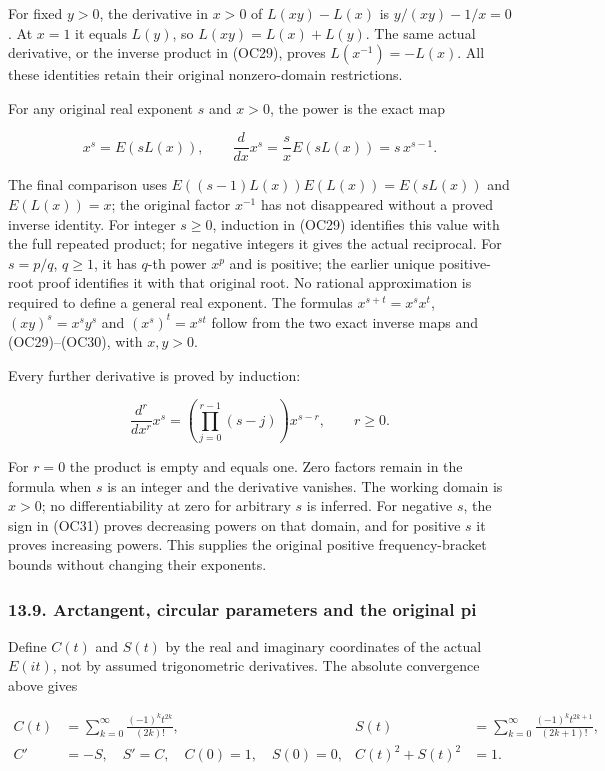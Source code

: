 \documentclass[
  11pt,
]{article}
\begin{document}
For fixed \(y>0\), the derivative in \(x>0\) of \(L(xy)-L(x)\) is
\(y/(xy)-1/x=0\). At \(x=1\) it equals \(L(y)\), so \(L(xy)=L(x)+L(y)\).
The same actual derivative, or the inverse product in (OC29), proves
\(L(x^{-1})=-L(x)\). All these identities retain their original
nonzero-domain restrictions.

For any original real exponent \(s\) and \(x>0\), the power is the exact
map

\[
 x^s=E(sL(x)),\qquad
 \frac{d}{dx}x^s=\frac{s}{x}E(sL(x))
   =s\,x^{s-1}.
\tag{OC31}
\]

The final comparison uses \(E((s-1)L(x))E(L(x))=E(sL(x))\) and
\(E(L(x))=x\); the original factor \(x^{-1}\) has not disappeared
without a proved inverse identity. For integer \(s\ge0\), induction in
(OC29) identifies this value with the full repeated product; for
negative integers it gives the actual reciprocal. For \(s=p/q\),
\(q\ge1\), it has \(q\)-th power \(x^p\) and is positive; the earlier
unique positive-root proof identifies it with that original root. No
rational approximation is required to define a general real exponent.
The formulas \(x^{s+t}=x^sx^t\), \((xy)^s=x^sy^s\) and
\((x^s)^t=x^{st}\) follow from the two exact inverse maps and
(OC29)--(OC30), with \(x,y>0\).

Every further derivative is proved by induction:

\[
 \frac{d^r}{dx^r}x^s
 =\left(\prod_{j=0}^{r-1}(s-j)\right)x^{s-r},
 \qquad r\ge0.
\tag{OC32}
\]

For \(r=0\) the product is empty and equals one. Zero factors remain in
the formula when \(s\) is an integer and the derivative vanishes. The
working domain is \(x>0\); no differentiability at zero for arbitrary
\(s\) is inferred. For negative \(s\), the sign in (OC31) proves
decreasing powers on that domain, and for positive \(s\) it proves
increasing powers. This supplies the original positive frequency-bracket
bounds without changing their exponents.

\subsubsection{13.9. Arctangent, circular parameters and the original
pi}\label{arctangent-circular-parameters-and-the-original-pi}

Define \(C(t)\) and \(S(t)\) by the real and imaginary coordinates of
the actual \(E(it)\), not by assumed trigonometric derivatives. The
absolute convergence above gives

\[
 \begin{aligned}
 C(t)&=\sum_{k=0}^\infty\frac{(-1)^k t^{2k}}{(2k)!},
 &S(t)&=\sum_{k=0}^\infty\frac{(-1)^k t^{2k+1}}{(2k+1)!},\\
 C'&=-S,\quad S'=C,\quad C(0)=1,\quad S(0)=0,
 &C(t)^2+S(t)^2&=1.
 \end{aligned}\tag{OC33}
\]
\end{document}
